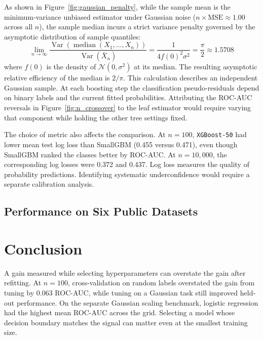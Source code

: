 \documentclass[journal]{IEEEtran}
\begin{document}
As shown in Figure~\ref{fig:gaussian_penalty}, while the sample mean is the minimum-variance unbiased estimator under Gaussian noise ($n \times \text{MSE} \approx 1.00$ across all $n$), the sample median incurs a strict variance penalty governed by the asymptotic distribution of sample quantiles:
\begin{equation}
\label{eq:asymptotic_efficiency}
\lim_{n\to\infty} \frac{\operatorname{Var}\left(\operatorname{median}(X_1,\ldots,X_n)\right)}{\operatorname{Var}(\bar X_n)} = \frac{1}{4 f(0)^2 \sigma^2} = \frac{\pi}{2} \approx 1.5708
\end{equation}
where $f(0)$ is the density of $\mathcal{N}(0,\sigma^2)$ at its median. The resulting asymptotic relative efficiency of the median is $2/\pi$. This calculation describes an independent Gaussian sample. At each boosting step the classification pseudo-residuals depend on binary labels and the current fitted probabilities. Attributing the ROC-AUC reversals in Figure~\ref{fig:n_crossover} to the leaf estimator would require varying that component while holding the other tree settings fixed.

The choice of metric also affects the comparison. At $n=100$, \texttt{XGBoost-50} had lower mean test log loss than SmallGBM (0.455 versus 0.471), even though SmallGBM ranked the classes better by ROC-AUC. At $n=10{,}000$, the corresponding log losses were 0.372 and 0.437. Log loss measures the quality of probability predictions. Identifying systematic underconfidence would require a separate calibration analysis.

\subsection{Performance on Six Public Datasets}\label{sec:real_results}


\section{Conclusion}
\label{sec:conclusion}

A gain measured while selecting hyperparameters can overstate the gain after refitting. At $n=100$, cross-validation on random labels overstated the gain from tuning by 0.063 ROC-AUC, while tuning on a Gaussian task still improved held-out performance. On the separate Gaussian scaling benchmark, logistic regression had the highest mean ROC-AUC across the grid. Selecting a model whose decision boundary matches the signal can matter even at the smallest training size.
\end{document}
